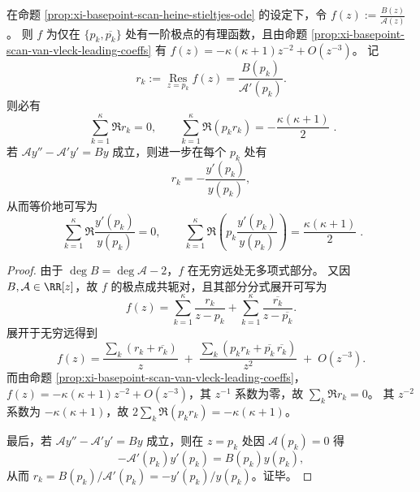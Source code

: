 \begin{proposition}\label{prop:xi-basepoint-scan-van-vleck-residue-moment01}
在命题 \ref{prop:xi-basepoint-scan-heine-stieltjes-ode} 的设定下，令
\(
f(z):=\frac{B(z)}{\mathcal{A}(z)}
\)。
则 \(f\) 为仅在 \(\{p_k,\overline{p_k}\}\) 处有一阶极点的有理函数，且由命题 \ref{prop:xi-basepoint-scan-van-vleck-leading-coeffs} 有
\(
f(z)=-\kappa(\kappa+1)z^{-2}+O(z^{-3})
\)。
记
\[
r_k:=\operatorname*{Res}_{z=p_k} f(z)=\frac{B(p_k)}{\mathcal{A}'(p_k)}.
\]
则必有
\[
\boxed{\;
\sum_{k=1}^{\kappa}\Re r_k=0,\qquad
\sum_{k=1}^{\kappa}\Re(p_k r_k)=-\frac{\kappa(\kappa+1)}{2}\; }.
\]
若 \(\mathcal{A}y''-\mathcal{A}'y'=By\) 成立，则进一步在每个 \(p_k\) 处有
\[
r_k=-\frac{y'(p_k)}{y(p_k)},
\]
从而等价地可写为
\[
\boxed{\;
\sum_{k=1}^{\kappa}\Re\frac{y'(p_k)}{y(p_k)}=0,\qquad
\sum_{k=1}^{\kappa}\Re\!\left(p_k\frac{y'(p_k)}{y(p_k)}\right)=\frac{\kappa(\kappa+1)}{2}\; }.
\]
\end{proposition}
\begin{proof}
由于 \(\deg B=\deg\mathcal{A}-2\)，\(f\) 在无穷远处无多项式部分。
又因 \(B,\mathcal{A}\in\RR[z]\)，故 \(f\) 的极点成共轭对，且其部分分式展开可写为
\[
f(z)=\sum_{k=1}^{\kappa}\frac{r_k}{z-p_k}+\sum_{k=1}^{\kappa}\frac{\overline{r_k}}{z-\overline{p_k}}.
\]
展开于无穷远得到
\[
f(z)=\frac{\sum_k(r_k+\overline{r_k})}{z}
\;+\;\frac{\sum_k(p_k r_k+\overline{p_k}\,\overline{r_k})}{z^2}
\;+\;O(z^{-3}).
\]
而由命题 \ref{prop:xi-basepoint-scan-van-vleck-leading-coeffs}，
\(
f(z)=-\kappa(\kappa+1)z^{-2}+O(z^{-3})
\)，其 \(z^{-1}\) 系数为零，故 \(\sum_k\Re r_k=0\)。
其 \(z^{-2}\) 系数为 \(-\kappa(\kappa+1)\)，故
\(
2\sum_k\Re(p_k r_k)=-\kappa(\kappa+1)
\)。
\par
最后，若 \(\mathcal{A}y''-\mathcal{A}'y'=By\) 成立，则在 \(z=p_k\) 处因 \(\mathcal{A}(p_k)=0\) 得
\[
-\mathcal{A}'(p_k)y'(p_k)=B(p_k)y(p_k),
\]
从而 \(r_k=B(p_k)/\mathcal{A}'(p_k)=-y'(p_k)/y(p_k)\)。证毕。
\end{proof}

